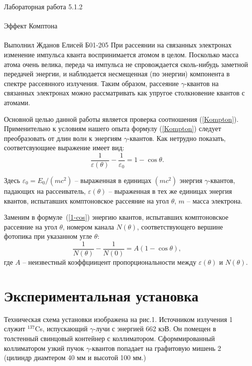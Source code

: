 \documentclass{astroedu-lab}
\begin{document}
\begin{problem}{\huge Лабораторная работа 5.1.2\\\\Эффект Комптона\\\\Выполнил Жданов Елисей Б01-205}
	При рассеянии на связанных электронах изменение импульса кванта воспринимается атомом в целом. Посколько масса атома очень велика, переда ча импульса не спровождается сколь-нибудь заметной передачей энергии, и наблюдается несмещенная (по энергии) компонента в спектре рассеянного излучения. Таким образом, рассеяние $\gamma$-квантов на связанных электронах можно рассматривать как упругое столкновение квантов с атомами.
	
	Основной целью данной работы является проверка соотношения (\ref{Kompton}). Применительно к условиям нашего опыта формулу (\ref{Kompton}) следует преобразовать от длин волн к энергиям $\gamma$-квантов. Как нетрудно показать, соответсвующиее выражение имеет вид:
	\begin{equation}
		\label{1-cos}
		\tag{$\star\star$}
		\frac{1}{\varepsilon(\theta)} - \frac{1}{\varepsilon_0} = 1 - \cos \theta.
	\end{equation}

	Здесь $\varepsilon_0 = E_0/(mc^2)$ -- выраженная в единицах $(mc^2)$ энергия $\gamma$-квантов, падающих на рассеиватель, $\varepsilon(\theta)$ -- выраженная в тех же единицах энергия квантов, испытавших комптоновское рассеяние на угол $\theta$, $m$ -- масса электрона.
	
	Заменим в формуле~(\ref{1-cos}) энергию квантов, испытавших комптоновское рассеяние на угол $\theta$, номером канала $N(\theta)$, соответствующего вершине фотопика при указанном угле $\theta$:
	\begin{equation}
		\label{kek}
		\tag{$\star \star \star$}
		\frac{1}{N(\theta)} - \frac{1}{N(0)} = A (1- \cos \theta),
	\end{equation}
	где $A$ -- неизвестный коэффциицент пропорциональности между $\varepsilon(\theta)$ и $N(\theta)$.

\section{Экспериментальная установка}


Техническая схема установки изображена на рис.1. Источником излучения 1 служит $^{137}$Cs, испускающий $\gamma$-лучи с энергией 662 кэВ. Он помещен в толстенный свинцовый контейнер с коллиматором. Сформмированный коллиматором узкий пучок $\gamma$-квантов попадает на графитовую мишень 2 (цилиндр диамтером 40 мм и высотой 100 мм.)





\end{problem}
\end{document}
